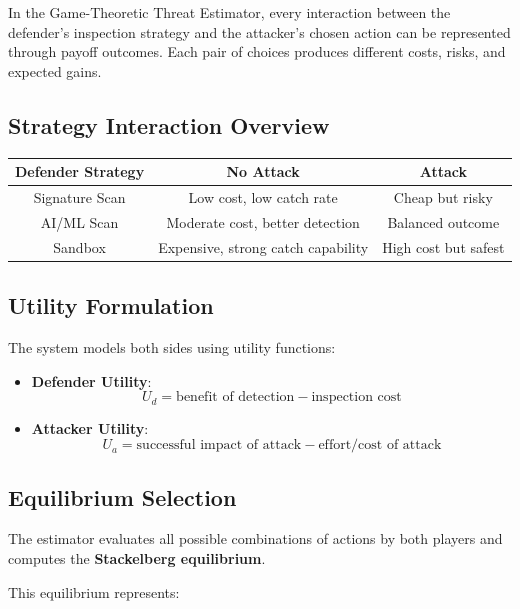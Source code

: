 \documentclass[12pt, a4paper]{report}
\begin{document}
In the Game-Theoretic Threat Estimator, every interaction between the defender’s inspection strategy and the attacker’s chosen action can be represented through payoff outcomes. Each pair of choices produces different costs, risks, and expected gains.

\subsection*{Strategy Interaction Overview}

\begin{table}[h!]
\centering
\begin{tabular}{|c|c|c|}
\hline
\textbf{Defender Strategy} & \textbf{No Attack} & \textbf{Attack} \\ \hline
Signature Scan & Low cost, low catch rate & Cheap but risky \\ \hline
AI/ML Scan & Moderate cost, better detection & Balanced outcome \\ \hline
Sandbox & Expensive, strong catch capability & High cost but safest \\ \hline
\end{tabular}
\end{table}

\subsection*{Utility Formulation}

The system models both sides using utility functions:

\begin{itemize}
    \item \textbf{Defender Utility}:
    \[
        U_d = \text{benefit of detection} - \text{inspection cost}
    \]

    \item \textbf{Attacker Utility}:
    \[
        U_a = \text{successful impact of attack} - \text{effort/cost of attack}
    \]
\end{itemize}

\subsection*{Equilibrium Selection}

The estimator evaluates all possible combinations of actions by both players and computes the \textbf{Stackelberg equilibrium}.  

This equilibrium represents:
\end{document}
